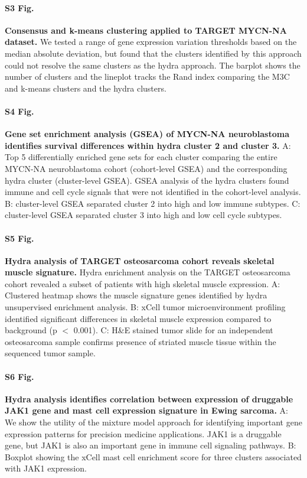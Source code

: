 \documentclass[10pt,letterpaper]{article}
\begin{document}
\paragraph*{S3 Fig.}
\label{S3_Fig}
{\bf{Consensus and k-means clustering applied to TARGET MYCN-NA dataset.}} We tested a range of gene expression variation thresholds based on the median absolute deviation, but found that the clusters identified by this approach could not resolve the same clusters as the hydra approach. The barplot shows the number of clusters and the lineplot tracks the Rand index comparing the M3C and k-means clusters and the hydra clusters.

\paragraph*{S4 Fig.}
\label{S4_Fig} {\bf Gene set enrichment analysis (GSEA) of MYCN-NA neuroblastoma identifies survival differences within hydra cluster 2 and cluster 3.} A: Top 5 differentially enriched gene sets for each cluster comparing the entire MYCN-NA neuroblastoma cohort (cohort-level GSEA) and the corresponding hydra cluster (cluster-level GSEA). GSEA analysis of the hydra clusters found immune and cell cycle signals that were not identified in the cohort-level analysis. B: cluster-level GSEA separated cluster 2 into high and low immune subtypes. C: cluster-level GSEA separated cluster 3 into high and low cell cycle subtypes.

\paragraph*{S5 Fig.}
\label{S5_Fig} {\bf Hydra analysis of TARGET osteosarcoma cohort reveals skeletal muscle signature.} Hydra enrichment analysis on the TARGET osteosarcoma cohort revealed a subset of patients with high skeletal muscle expression. A: Clustered heatmap shows the muscle signature genes identified by hydra unsupervised enrichment analysis. B: xCell tumor microenvironment profiling identified significant differences in skeletal muscle expression compared to background (p $<$ 0.001). C: H\&E stained tumor slide for an independent osteosarcoma sample confirms presence of striated muscle tissue within the sequenced tumor sample.

\paragraph*{S6 Fig.}
\label{S6_Fig} {\bf Hydra analysis identifies correlation between expression of druggable JAK1 gene and mast cell expression signature in Ewing sarcoma.} A: We show the utility of the mixture model approach for identifying important gene expression patterns for precision medicine applications. JAK1 is a druggable gene, but JAK1 is also an important gene in immune cell signaling pathways. B: Boxplot showing the xCell mast cell enrichment score for three clusters associated with JAK1 expression.
\end{document}
